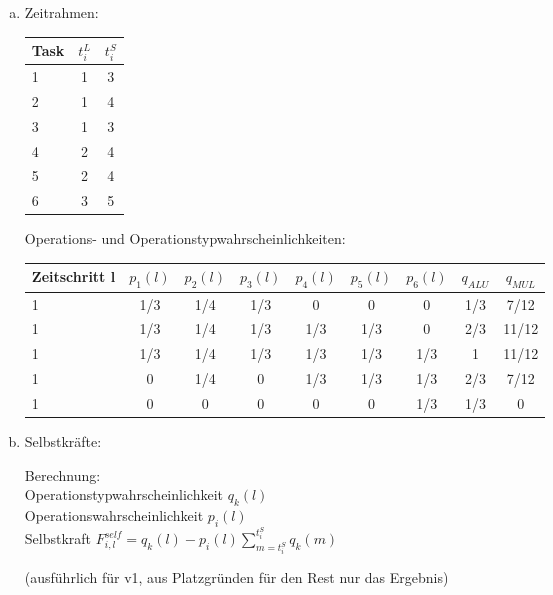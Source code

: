\documentclass[a4paper]{scrartcl}
\begin{document}
\begin{enumerate}[(a)]
	\item Zeitrahmen:
	
	\begin{tabular}{|l||c|c|}
		\hline 
		Task& $t_i^L$ & $t_i^S$ \\ 
		\hline 
		1& 1 & 3 \\ 
		\hline 
		2& 1 & 4 \\ 
		\hline 
		3& 1 & 3 \\ 
		\hline 
		4& 2 & 4 \\ 
		\hline 
		5& 2 & 4 \\ 
		\hline 
		6& 3 & 5 \\ 
		\hline 
	\end{tabular} 
	
	Operations- und Operationstypwahrscheinlichkeiten:
	
	\begin{tabular}{|l||c|c|c|c|c|c|c|c|}
		\hline 
		Zeitschritt l& $p_1(l)$ & $p_2(l)$ & $p_3(l)$ & $p_4(l)$ & $p_5(l)$ & $p_6(l)$ & $q_{ALU}$ & $q_{MUL}$ \\ 
		\hline 
		1& 1/3 & 1/4 & 1/3 & 0   & 0   & 0   & 1/3 & 7/12 \\ 
		\hline 
		1& 1/3 & 1/4 & 1/3 & 1/3 & 1/3 & 0   & 2/3 & 11/12 \\ 
		\hline 
		1& 1/3 & 1/4 & 1/3 & 1/3 & 1/3 & 1/3 & 1   & 11/12 \\ 
		\hline 
		1& 0   & 1/4 & 0   & 1/3 & 1/3 & 1/3 & 2/3 & 7/12 \\ 
		\hline 
		1& 0   & 0   & 0   & 0   & 0   & 1/3 & 1/3 & 0 \\ 
		\hline 
	\end{tabular} 
	
	\item Selbstkräfte:
	
	Berechnung:\\
	Operationstypwahrscheinlichkeit $q_k(l)$\\
	Operationswahrscheinlichkeit $p_i(l)$\\
	Selbstkraft $F_{i,l}^{self} = q_k(l) - p_i(l) \sum_{m=t_i^S}^{t_i^S}q_k(m)$
	
	
	(ausführlich für v1, aus Platzgründen für den Rest nur das Ergebnis)
	

\end{enumerate}
\end{document}
